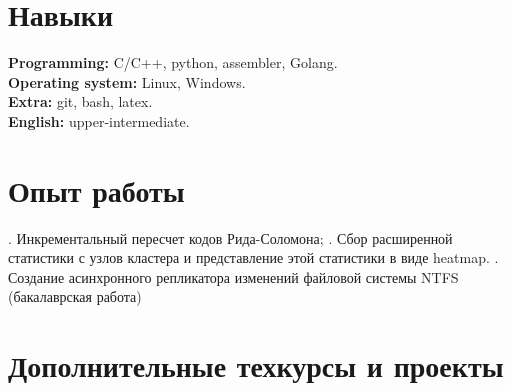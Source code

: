 \documentclass[letterpaper]{twentysecondcv} %
\begin{document}
\section{Навыки} 

{\textbf{Programming:}} {C/C++, python, assembler, Golang.}\\ 
{\textbf{Operating system:}} Linux, Windows. \\
{\textbf{Extra:}} git, bash, latex. \\
{\textbf{English:}} upper-intermediate. \\

\section{Опыт работы}

\begin{twenty} %
	
{
. Инкрементальный пересчет кодов Рида-Соломона; 
. Сбор расширенной статистики с узлов кластера и представление этой статистики в виде heatmap.
. Создание асинхронного репликатора изменений файловой системы NTFS (бакалаврская работа)

}
\end{twenty}


\section{Дополнительные техкурсы и проекты}
\end{document}
